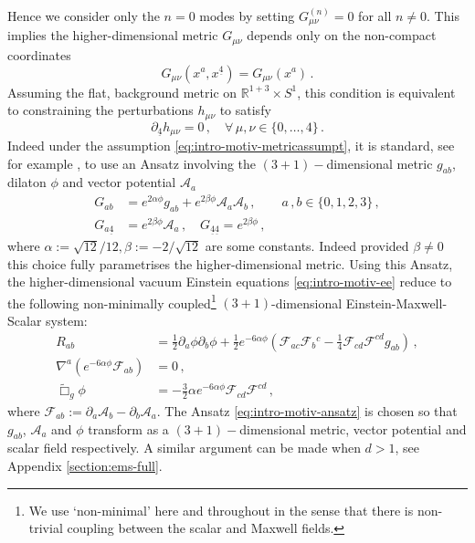\documentclass[11pt, a4paper]{amsart}
\numberwithin{equation}{section}
\numberwithin{theorem}{section}
\newcommand{\R}{\mathbb{R}}
\newcommand{\p}{\partial}
\newcommand{\mn}{{\mu \nu}}
\newcommand{\obar}{{\underline{4}}}
\newcommand{\tbox}{\widetilde{\Box}}
\begin{document}
Hence we consider only the $n=0$ modes by setting $G^{(n)}_\mn = 0$ for all $n \neq 0$. This implies the higher-dimensional metric $G_\mn$ depends only on the non-compact coordinates
\begin{equation} G_\mn(x^a, x^\obar) = G_\mn(x^a) \,. \label{eq:intro-motiv-metricassumpt} \end{equation}
Assuming the flat, background metric on $\R^{1+3} \times S^1$, this condition is equivalent to constraining the perturbations $h_\mn$ to satisfy
$$ \p_\obar h_\mn = 0\,,  \quad \forall \, \mu, \nu \in \{ 0, \ldots, 4 \} \,. $$
Indeed under the assumption  \eqref{eq:intro-motiv-metricassumpt}, it is standard, see for example \cite{Pope}, to use an Ansatz involving the $(3+1)-$dimensional metric $g_{ab}$, dilaton $\phi$ and vector potential $\mathcal{A}_a$
\begin{equation} \begin{split} 
G_{ab} & = e^{2 \alpha \phi} g_{ab} + e^{2 \beta \phi} \mathcal{A}_a \mathcal{A}_b \,, \qquad a \,,b \in \{ 0, 1, 2, 3 \} \,,\\
G_{a \obar} & = e^{2 \beta \phi} \mathcal{A}_a\,, \quad G_{\obar \obar} = e^{2 \beta \phi} \,,
\end{split} \label{eq:intro-motiv-ansatz} \end{equation}
where $\alpha := \sqrt{12}/12, \beta := - 2 / \sqrt{12}$ are some  constants. Indeed provided $\beta \neq 0$ this choice fully parametrises the higher-dimensional metric. Using this Ansatz, the higher-dimensional vacuum Einstein equations \eqref{eq:intro-motiv-ee} reduce to the following non-minimally coupled\footnote{We use `non-minimal' here and throughout in the sense that there is non-trivial coupling between the scalar and Maxwell fields.} $(3+1)$-dimensional Einstein-Maxwell-Scalar system:
\begin{subequations} \label{eq:intro-motiv-ems}
\begin{align}
R_{ab} &= \frac{1}{2} \p_a \phi \p_b \phi + \frac{1}{2} e^{-6\alpha \phi} \left( \mathcal{F}_{ac} \mathcal{F}_b {}^c - \frac{1}{4} \mathcal{F}_{cd} \mathcal{F}^{cd} g_{ab} \right) \,, \label{eq:intro-motiv-ems-1} \\
\nabla^a \left( e^{- 6 \alpha \phi} \mathcal{F}_{ab} \right) &= 0 \,, \label{eq:intro-motiv-ems-2} \\
\tbox_g \phi &= - \frac{3}{2} \alpha e^{- 6 \alpha \phi} \mathcal{F}_{cd} \mathcal{F}^{cd}\,, \label{eq:intro-motiv-ems-3}
\end{align} 
\end{subequations} 
where $\mathcal{F}_{ab} := \p_a \mathcal{A}_b - \p_b \mathcal{A}_a$. 
The Ansatz \eqref{eq:intro-motiv-ansatz} is chosen so that $g_{ab}$, $\mathcal{A}_a$ and $\phi$ transform as a $(3+1)-$dimensional metric, vector potential and scalar field respectively. A similar argument can be made when $d >1$, see Appendix \ref{section:ems-full}. 
\end{document}
